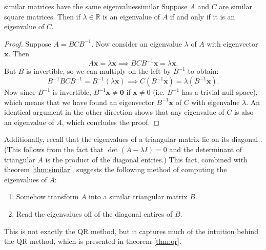 \documentclass{article}
\let\vec\mathbf
\begin{document}
\begin{theorem}{similar matrices have the same eigenvalues}{similar}
  Suppose $A$ and $C$ are similar square matrices. Then if $\lambda \in \mathbb{R}$ is an eigenvalue of $A$ if and only if it is an eigenvalue of $C$. 
\end{theorem}
\begin{proof}
  Suppose $A = BCB^{-1}$. Now consider an eigenvalue $\lambda$ of $A$ with eigenvector $\vec{x}$. Then
  \begin{equation*}
    A\vec{x} = \lambda\vec{x} \implies BCB^{-1}\vec{x} = \lambda\vec{x}.
  \end{equation*}
  But $B$ is invertible, so we can multiply on the left by $B^{-1}$ to obtain:
  \begin{equation*}
    B^{-1}BCB^{-1} = B^{-1}(\lambda\vec{x}) \implies C(B^{-1}\vec{x}) = \lambda(B^{-1}\vec{x}).
  \end{equation*}
  Now since $B^{-1}$ is invertible, $B^{-1}\vec{x} \neq \vec{0}$ if $\vec{x} \neq 0$ (i.e. $B^{-1}$ has a trivial null space), which means that we have found an eigenvector $B^{-1}\vec{x}$ of $C$ with eigenvalue $\lambda$. An identical argument in the other direction shows that any eigenvalue of $C$ is also an eigenvalue of $A$, which concludes the proof.
\end{proof}

Additionally, recall that the eigenvalues of a triangular matrix lie on its diagonal \cite[p.~294]{strang}. (This follows from the fact that $\det(A - \lambda I) = 0$ and the determinant of triangular $A$ is the product of the diagonal entries.) This fact, combined with theorem \ref{thm:similar}, suggests the following method \cite[p.~530]{strang} of computing the eigenvalues of $A$:
\begin{enumerate}
  \item Somehow transform $A$ into a similar triangular matrix $B$.
  \item Read the eigenvalues off of the diagonal entires of $B$.
\end{enumerate}
This is not exactly the QR method, but it captures much of the intuition behind the QR method, which is presented in theorem \ref{thm:qr}.
\end{document}
